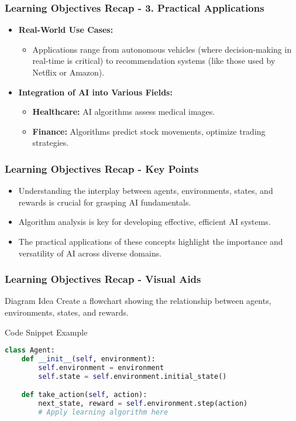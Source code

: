 \documentclass{beamer}
\begin{document}
\begin{frame}[fragile]
    \frametitle{Learning Objectives Recap - 3. Practical Applications}
    \begin{itemize}
        \item \textbf{Real-World Use Cases:}
        \begin{itemize}
            \item Applications range from autonomous vehicles (where decision-making in real-time is critical) to recommendation systems (like those used by Netflix or Amazon).
        \end{itemize}
        
        \item \textbf{Integration of AI into Various Fields:}
        \begin{itemize}
            \item \textbf{Healthcare:} AI algorithms assess medical images.
            \item \textbf{Finance:} Algorithms predict stock movements, optimize trading strategies.
        \end{itemize}
    \end{itemize}
\end{frame}

\begin{frame}[fragile]
    \frametitle{Learning Objectives Recap - Key Points}
    \begin{itemize}
        \item Understanding the interplay between agents, environments, states, and rewards is crucial for grasping AI fundamentals.
        \item Algorithm analysis is key for developing effective, efficient AI systems.
        \item The practical applications of these concepts highlight the importance and versatility of AI across diverse domains.
    \end{itemize}
\end{frame}

\begin{frame}[fragile]
    \frametitle{Learning Objectives Recap - Visual Aids}
    \begin{block}{Diagram Idea}
        Create a flowchart showing the relationship between agents, environments, states, and rewards.
    \end{block}

    \begin{block}{Code Snippet Example}
    \begin{lstlisting}[language=Python]
class Agent:
    def __init__(self, environment):
        self.environment = environment
        self.state = self.environment.initial_state()

    def take_action(self, action):
        next_state, reward = self.environment.step(action)
        # Apply learning algorithm here
    \end{lstlisting}
    \end{block}
\end{frame}
\end{document}
